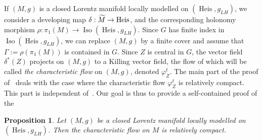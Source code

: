 \documentclass[11pt]{article}
\newtheorem{prop}[theo]{Proposition}
\theoremstyle{definition}
\numberwithin{equation}{section}
\numberwithin{figure}{section}
\numberwithin{table}{section}
\DeclareMathOperator{\Iso}{Iso}
\DeclareMathOperator{\Heis}{Heis}
\let\oldtilde\tilde
\renewcommand*\tilde[1]{\mathchoice{\widetilde{#1}}{\widetilde{#1}}{\widetilde{#1}}{\oldtilde{#1}}}
\begin{document}
If $(M,g)$ is a closed Lorentz manifold locally modelled on $(\Heis, g_{LH})$, we consider a developing map $\delta: \tilde{M} \to \Heis$, and the corresponding holonomy morphism $\rho: \pi_1(M) \to \Iso(\Heis, g_{LH})$. Since $G$ has finite index in $\Iso(\Heis, g_{LH})$, we can replace $(M,g)$ by a finite cover and assume that $\Gamma:=\rho(\pi_1(M))$ is contained in $G$. Since $Z$ is central in $G$, the vector field $\delta^*(Z)$ projects on $(M,g)$ to a Killing vector field, the flow of which will be called \emph{the characteristic flow} on $(M,g)$, denoted ${\varphi}_Z^t$. The main part of the proof of~\cite[Proposition~8.1]{sorin.ghani} deals with the case where the characteristic flow ${\varphi}_Z^t$ is relatively compact. This part is independent of~\cite{zeghibflot}. Our goal is thus to provide a self-contained proof of the



\begin{prop}\label{prop.complete2}
Let $(M,g)$ be a closed Lorentz manifold locally modelled on $(\Heis,g_{LH})$. Then the characteristic flow on $M$ is relatively compact.
\end{prop}
\end{document}
